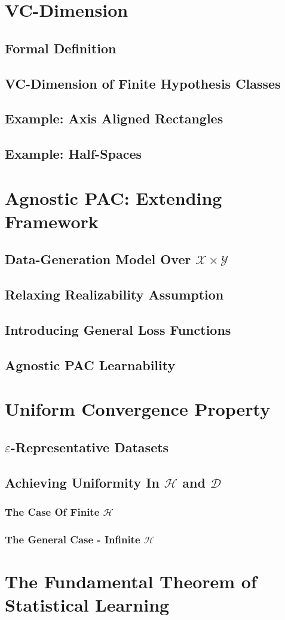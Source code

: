     \section{VC-Dimension}
        \subsection{Formal Definition}
        \subsection{VC-Dimension of Finite Hypothesis Classes}
        \subsection{Example: Axis Aligned Rectangles}
        \subsection{Example: Half-Spaces}
        
    \section{Agnostic PAC: Extending Framework}
        \subsection{Data-Generation Model Over $\mathcal{X}\times\mathcal{Y}$}
        \subsection{Relaxing Realizability Assumption}
        \subsection{Introducing General Loss Functions}
        \subsection{Agnostic PAC Learnability}
    
    \section{Uniform Convergence Property}
        \subsection{$\varepsilon$-Representative Datasets}
        \subsection{Achieving Uniformity In $\mathcal{H}$ and $\mathcal{D}$}
            \subsubsection{The Case Of Finite $\mathcal{H}$}
            \subsubsection{The General Case - Infinite $\mathcal{H}$}
    
    \section{The Fundamental Theorem of Statistical Learning}